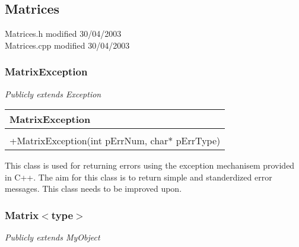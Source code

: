 \subsection{Matrices}
{\footnotesize Matrices.h modified  30/04/2003 \\
 Matrices.cpp modified 30/04/2003}
 
\subsubsection{MatrixException}
\emph{Publicly extends Exception}

\begin{table}[h]
\begin{tabular}{|l|}\hline
\textbf{MatrixException}\\
\hline
\\
\hline
+MatrixException(int pErrNum, char* pErrType)\\
\hline
\end{tabular}
\end{table}

This class is used for returning errors using the exception mechanisem provided in C++. The aim for this class is to return simple and standerdized error messages. This class needs to be improved upon.
\subsubsection{Matrix$<$type$>$}
\emph{Publicly extends MyObject}

